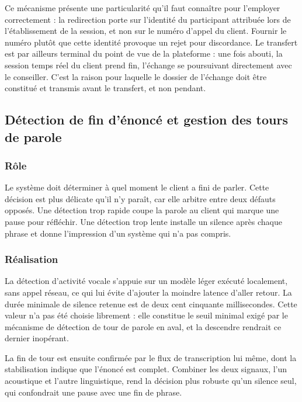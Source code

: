 Ce mécanisme présente une particularité qu'il faut connaître pour l'employer correctement : la redirection porte sur l'identité du participant attribuée lors de l'établissement de la session, et non sur le numéro d'appel du client. Fournir le numéro plutôt que cette identité provoque un rejet pour discordance. Le transfert est par ailleurs terminal du point de vue de la plateforme : une fois abouti, la session temps réel du client prend fin, l'échange se poursuivant directement avec le conseiller. C'est la raison pour laquelle le dossier de l'échange doit être constitué et transmis avant le transfert, et non pendant.

\subsection{Détection de fin d'énoncé et gestion des tours de parole}

\subsubsection{Rôle}

Le système doit déterminer à quel moment le client a fini de parler. Cette décision est plus délicate qu'il n'y paraît, car elle arbitre entre deux défauts opposés. Une détection trop rapide coupe la parole au client qui marque une pause pour réfléchir. Une détection trop lente installe un silence après chaque phrase et donne l'impression d'un système qui n'a pas compris.

\subsubsection{Réalisation}

La détection d'activité vocale s'appuie sur un modèle léger exécuté localement, sans appel réseau, ce qui lui évite d'ajouter la moindre latence d'aller retour. La durée minimale de silence retenue est de deux cent cinquante millisecondes. Cette valeur n'a pas été choisie librement : elle constitue le seuil minimal exigé par le mécanisme de détection de tour de parole en aval, et la descendre rendrait ce dernier inopérant.

La fin de tour est ensuite confirmée par le flux de transcription lui même, dont la stabilisation indique que l'énoncé est complet. Combiner les deux signaux, l'un acoustique et l'autre linguistique, rend la décision plus robuste qu'un silence seul, qui confondrait une pause avec une fin de phrase.

